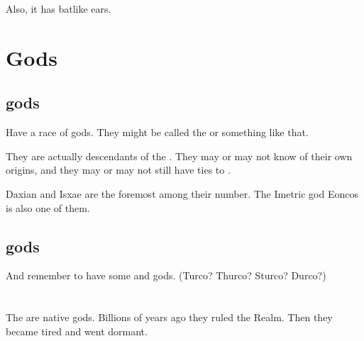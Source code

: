 Also, it has batlike ears. 















\section{Gods}
\subsection{\Human{} gods}
Have a race of \human{} gods. They might be called the  or something like that. 

They are actually descendants of the \Kezeradi. They may or may not know of their own origins, and they may or may not still have ties to \Kezerad. 

Daxian and Isxae are the foremost among their number. The Imetric god Eoncos is also one of them. 







\subsection[Scathaese gods]{\Scathaese gods}
And remember to have some \Ortaican{} and \Shurco{} gods. (Turco? Thurco? Sturco? Durco?)















\section{\Krakens}
The \krakens{} are native \Miithian{} gods. 
Billions of years ago they ruled the Realm. 
Then they became tired and went dormant. 















